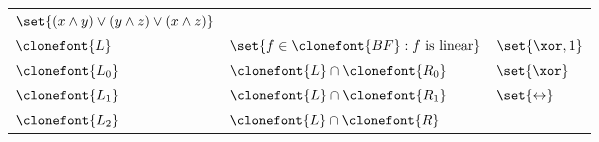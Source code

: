 \documentclass[11pt]{article}
\begin{document}
\begin{figure}[hbtp]
\begin{small}
\begin{longtable}[]{p{}p{}p{}}
\begin{minipage}[t]{0.38\columnwidth}
                \(\set{(x \land y) \lor (y \land {z}) \lor (x \land {z})}\)\strut
            \end{minipage}\tabularnewline
            \begin{minipage}[t]{0.12\columnwidth}\raggedright
                \(\clonefont{L}\)\strut
            \end{minipage} & \begin{minipage}[t]{0.41\columnwidth}\raggedright
                \(\set{f \in \clonefont{BF} : f \text{ is linear}}\)\strut
            \end{minipage} & \begin{minipage}[t]{0.38\columnwidth}\raggedright
                \(\set{\xor, 1}\)\strut
            \end{minipage}\tabularnewline
            \begin{minipage}[t]{0.12\columnwidth}\raggedright
                \(\clonefont{L_0}\)\strut
            \end{minipage} & \begin{minipage}[t]{0.41\columnwidth}\raggedright
                \(\clonefont{L} \cap \clonefont{R_0}\)\strut
            \end{minipage} & \begin{minipage}[t]{0.38\columnwidth}\raggedright
                \(\set{\xor}\)\strut
            \end{minipage}\tabularnewline
            \begin{minipage}[t]{0.12\columnwidth}\raggedright
                \(\clonefont{L_1}\)\strut
            \end{minipage} & \begin{minipage}[t]{0.41\columnwidth}\raggedright
                \(\clonefont{L} \cap \clonefont{R_1}\)\strut
            \end{minipage} & \begin{minipage}[t]{0.38\columnwidth}\raggedright
                \(\set{\leftrightarrow}\)\strut
            \end{minipage}\tabularnewline
            \begin{minipage}[t]{0.12\columnwidth}\raggedright
                \(\clonefont{L_2}\)\strut
            \end{minipage} & \begin{minipage}[t]{0.41\columnwidth}\raggedright
                \(\clonefont{L} \cap \clonefont{R}\)\strut
            \end{minipage} & \begin{minipage}[t]{0.38\columnwidth}\raggedright

\end{minipage}
\end{longtable}
\end{small}
\end{figure}
\end{document}

